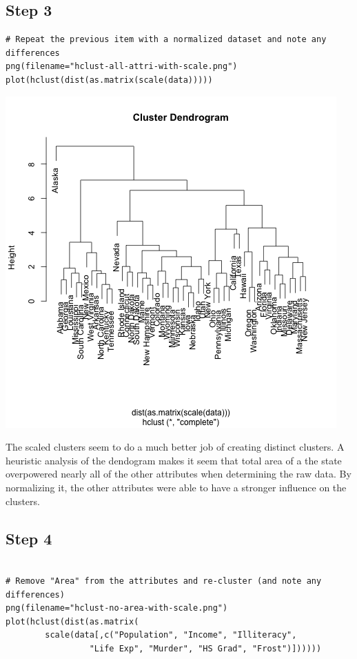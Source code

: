 \documentclass[11pt]{article}
\begin{document}
\subsection*{Step 3}
\label{sec:org7f5639f}
\begin{verbatim}
# Repeat the previous item with a normalized dataset and note any differences
png(filename="hclust-all-attri-with-scale.png")
plot(hclust(dist(as.matrix(scale(data)))))
\end{verbatim}

\begin{center}
\includegraphics[width=.9\linewidth]{hclust-all-attri-with-scale.png}
\end{center}

The scaled clusters seem to do a much better job of creating distinct clusters.
A heuristic analysis of the dendogram makes it seem that total area of a the
state overpowered nearly all of the other attributes when determining the raw
data. By normalizing it, the other attributes were able to have a stronger
influence on the clusters.
\subsection*{Step 4}
\label{sec:org01b5db3}
\begin{verbatim}

# Remove "Area" from the attributes and re-cluster (and note any differences)
png(filename="hclust-no-area-with-scale.png")
plot(hclust(dist(as.matrix(
        scale(data[,c("Population", "Income", "Illiteracy",
                 "Life Exp", "Murder", "HS Grad", "Frost")])))))
\end{verbatim}
\end{document}
